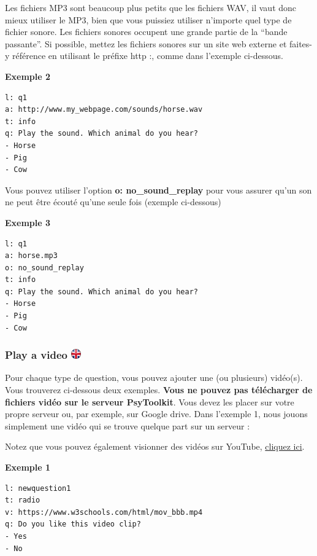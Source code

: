 \documentclass[
]{book}
\begin{document}
Les fichiers MP3 sont beaucoup plus petits que les fichiers WAV, il vaut
donc mieux utiliser le MP3, bien que vous puissiez utiliser n'importe
quel type de fichier sonore. Les fichiers sonores occupent une grande
partie de la ``bande passante''. Si possible, mettez les fichiers
sonores sur un site web externe et faites-y référence en utilisant le
préfixe http :, comme dans l'exemple ci-dessous.

\textbf{Exemple 2}

\begin{verbatim}
l: q1
a: http://www.my_webpage.com/sounds/horse.wav
t: info
q: Play the sound. Which animal do you hear?
- Horse
- Pig
- Cow
\end{verbatim}

Vous pouvez utiliser l'option \textbf{o: no\_sound\_replay} pour vous
assurer qu'un son ne peut être écouté qu'une seule fois (exemple
ci-dessous)

\textbf{Exemple 3}

\begin{verbatim}
l: q1
a: horse.mp3
o: no_sound_replay
t: info
q: Play the sound. Which animal do you hear?
- Horse
- Pig
- Cow
\end{verbatim}

\hypertarget{play-a-video-ukflag}{%
\subsubsection[Play a video ]{\texorpdfstring{Play a video
\href{https://www.psytoolkit.org/doc3.1.0/online-survey-syntax.html\#video}{\protect\includegraphics{img/ukflag.png}}}{Play a video ukflag}}\label{play-a-video-ukflag}}

Pour chaque type de question, vous pouvez ajouter une (ou plusieurs)
vidéo(s). Vous trouverez ci-dessous deux exemples. \textbf{Vous ne
pouvez pas télécharger de fichiers vidéo sur le serveur PsyToolkit}.
Vous devez les placer sur votre propre serveur ou, par exemple, sur
Google drive. Dans l'exemple 1, nous jouons simplement une vidéo qui se
trouve quelque part sur un serveur :

Notez que vous pouvez également visionner des vidéos sur YouTube,
\protect\hyperlink{Youtube}{cliquez ici}.

\textbf{Exemple 1}

\begin{verbatim}
l: newquestion1
t: radio
v: https://www.w3schools.com/html/mov_bbb.mp4
q: Do you like this video clip?
- Yes
- No
\end{verbatim}
\end{document}
